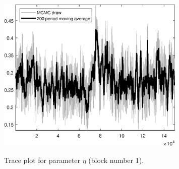 \begin{figure}[H]
\centering
  \includegraphics[width=0.8\textwidth]{BRS_gen/graphs/TracePlot_eta_blck_1}\\
    \caption{Trace plot for parameter ${\eta}$ (block number 1).}
\end{figure}
